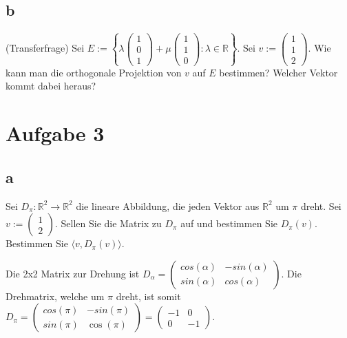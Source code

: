 \subsection{b}
(Transferfrage) Sei $E := \left\{\lambda\begin{pmatrix}
    1 \\ 0 \\ 1
\end{pmatrix} + \mu \begin{pmatrix}
    1 \\ 1 \\ 0
\end{pmatrix}: \lambda \in \mathbb{R}\right\}$. Sei $v := \begin{pmatrix}
    1 \\ 1 \\ 2
\end{pmatrix}$. Wie kann man die orthogonale Projektion von $v$ auf $E$ bestimmen? Welcher Vektor kommt dabei heraus?

\section{Aufgabe 3}

\subsection{a}
Sei $D_\pi: \mathbb{R}^2 \rightarrow \mathbb{R}^2$ die lineare Abbildung, die jeden Vektor aus $\mathbb{R}^2$ um 
$\pi$ dreht. Sei $v := \begin{pmatrix}1 \\2\end{pmatrix}$. Sellen Sie die Matrix zu $D_\pi$ auf und bestimmen Sie 
$D_\pi(v)$. Bestimmen Sie $\langle v, D_\pi(v)\rangle$.

Die 2x2 Matrix zur Drehung ist $D_\alpha = \begin{pmatrix}
    cos(\alpha) & -sin(\alpha) \\ sin(\alpha) & cos(\alpha)
\end{pmatrix}$. Die Drehmatrix, welche um $\pi$ dreht, ist somit $D_\pi = \begin{pmatrix}
    cos(\pi) & -sin(\pi) \\ sin(\pi) & \cos(\pi)
\end{pmatrix} = \begin{pmatrix}
    -1 & 0 \\ 0 & -1
\end{pmatrix}$.

